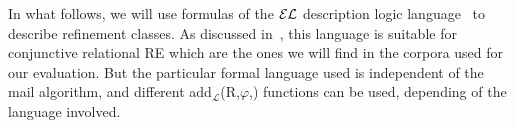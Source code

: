 In what follows, we will use formulas of the $\mathcal{EL}$ description logic language~\cite{} to describe refinement classes.  As discussed in~\cite{arec2:2008:Areces}, this language is suitable for conjunctive relational RE which are the ones we will find in the corpora used for our evaluation.  But the particular formal language used is independent of the mail algorithm, and different add$_{\mathcal{L}}$(R,$\varphi$,\RE) 
functions can be used, depending of the language involved.     









